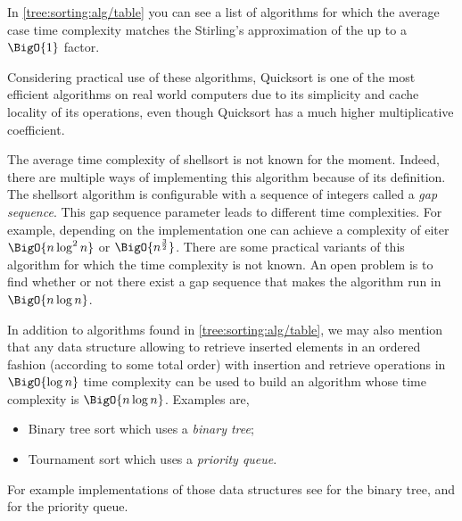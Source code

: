 In \ref{tree:sorting:alg/table} you can see a list of algorithms for which the
average case time complexity matches the Stirling's approximation of the
 up to a $\BigO{1}$ factor.

Considering practical use of these algorithms, Quicksort is one of the most
efficient algorithms on real world computers due to its simplicity and cache
locality of its operations, even though Quicksort has a much higher
multiplicative coefficient.

The average time complexity of shellsort is not known for the moment. Indeed,
there are multiple ways of implementing this algorithm because of its
definition. The shellsort algorithm is configurable with a sequence of integers
called a \emph{gap sequence}. This gap sequence parameter leads to different
time complexities. For example, depending on the implementation one can achieve
a complexity of eiter $\BigO{n \log^2 n}$ or $\BigO{n^{\frac{3}{2}}}$. There
are some practical variants of this algorithm for which the time complexity is
not known. An open problem is to find whether or not there exist a gap sequence
that makes the algorithm run in $\BigO{n \log n}$.

In addition to algorithms found in \ref{tree:sorting:alg/table}, we may also
mention that any data structure allowing to retrieve inserted elements in an
ordered fashion (according to some total order) with insertion and retrieve
operations in $\BigO{\log n}$ time complexity can be used to build an algorithm
whose time complexity is $\BigO{n \log n}$. Examples are,

\begin{itemize}
\item Binary tree sort which uses a \emph{binary tree};
\item Tournament sort which uses a \emph{priority queue}.
\end{itemize}

For example implementations of those data structures see
\citet*{sleator1985self} for the binary tree, and
\citet*{leiserson2001introduction} for the priority queue.
